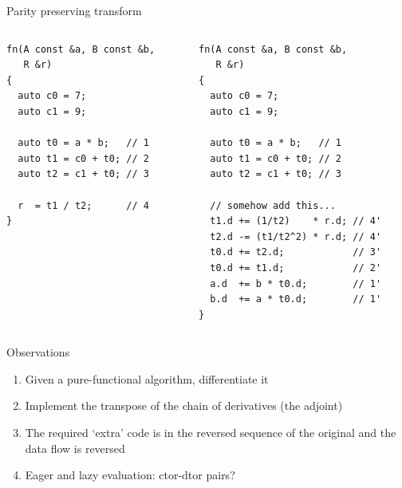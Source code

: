 \documentclass[xcolor=dvipsnames]{beamer}
\begin{document}
\begin{frame}[fragile]{Parity preserving transform}
  \begin{columns}[T] %
    \begin{column}{0.44\textwidth}
      {\color{gray}{write something like this \dots}}
      \begin{lstlisting}
fn(A const &a, B const &b,
   R &r)
{
  auto c0 = 7;
  auto c1 = 9;

  auto t0 = a * b;   // 1
  auto t1 = c0 + t0; // 2
  auto t2 = c1 + t0; // 3

  r  = t1 / t2;      // 4
}
  \end{lstlisting}
    \end{column}%
    \hfill%
    \begin{column}{0.56\textwidth}
      {\color{gray}{to implement something like this}}
        \begin{lstlisting}
fn(A const &a, B const &b,
   R &r)
{
  auto c0 = 7;
  auto c1 = 9;

  auto t0 = a * b;   // 1
  auto t1 = c0 + t0; // 2
  auto t2 = c1 + t0; // 3

  // somehow add this...
  t1.d += (1/t2)    * r.d; // 4'
  t2.d -= (t1/t2^2) * r.d; // 4'
  t0.d += t2.d;            // 3'
  t0.d += t1.d;            // 2'
  a.d  += b * t0.d;        // 1'
  b.d  += a * t0.d;        // 1'
}
  \end{lstlisting}
    \end{column}%
  \end{columns}
\end{frame}


\begin{frame}[fragile]{Observations}
  \begin{enumerate}
  \item Given a pure-functional algorithm, differentiate it \vspace{5mm}
  \item Implement the transpose of the chain of derivatives (the adjoint) \vspace{5mm}
  \item The required `extra' code is in the reversed sequence of the original and the data flow is reversed \vspace{5mm}
  \item Eager and lazy evaluation: ctor-dtor pairs? \vspace{5mm}
  \end{enumerate}
\end{frame}
\end{document}
